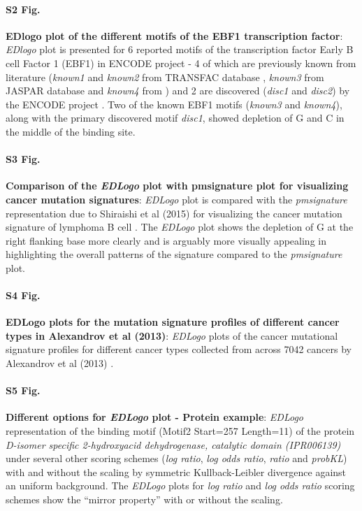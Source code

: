 \documentclass{bmcart}
\begin{document}
\begin{backmatter}
\paragraph*{S2 Fig.}
\label{fig:suppfig2}
\textbf{EDlogo plot of the different motifs of the EBF1 transcription factor}:  \textit{EDlogo} plot is presented for 6 reported motifs of the transcription factor Early B cell Factor 1 (EBF1) in ENCODE project - 4 of which are previously known from literature (\textit{known1} and \textit{known2} from TRANSFAC database \cite{Wingender2000}, \textit{known3} from  JASPAR database \cite{Sandelin2004} and \textit{known4} from \cite{Jolma2013}) and 2 are discovered (\textit{disc1} and \textit{disc2}) by the ENCODE project \cite{Kheradpour2013}.  Two of the known EBF1 motifs (\textit{known3} and \textit{known4}), along with the primary discovered motif \textit{disc1},  showed depletion of G and C in the middle of the binding site.


\paragraph*{S3 Fig.}
\label{fig:suppfig3}
 \textbf{Comparison of the \textit{EDLogo} plot with pmsignature plot for visualizing cancer mutation signatures}: 
 \textit{EDLogo} plot is compared with the \textit{pmsignature} representation due to Shiraishi et al (2015) \cite{Shiraishi2015} for visualizing the cancer mutation signature of lymphoma B cell \cite{Alexandrov2013}. The \textit{EDLogo} plot shows the depletion of G at the right flanking base more clearly and is arguably more visually appealing in highlighting the overall patterns of the signature compared to the \textit{pmsignature} plot.

\paragraph*{S4 Fig.}
\label{fig:suppfig4}
\textbf{EDLogo plots for the mutation signature profiles of different cancer types in Alexandrov et al (2013)}: 
 \textit{EDLogo} plots of the cancer mutational signature profiles for different cancer types collected from across 7042 cancers by Alexandrov et al (2013) \cite{Alexandrov2013}.

\paragraph*{S5 Fig.}
\label{fig:suppfig5}   
\textbf{Different options for \textit{EDLogo} plot - Protein example}:  \textit{EDLogo} representation  of the binding motif (Motif2 Start=257 Length=11) of the protein \textit{D-isomer specific 2-hydroxyacid dehydrogenase, catalytic domain (IPR006139)} under several other scoring schemes  (\textit{log ratio}, \textit{log odds ratio}, \textit{ratio} and \textit{probKL}) 
with and without the scaling by symmetric Kullback-Leibler divergence against an uniform background.  The \textit{EDLogo} plots for \textit{log ratio} and \textit{log odds ratio} scoring schemes show the ``mirror property'' with or without the scaling.


\end{backmatter}
\end{document}
